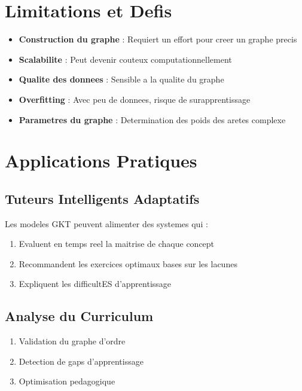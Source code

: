 \documentclass[11pt, a4paper]{article}
\begin{document}
\section{Limitations et Defis}

\begin{itemize}
    \item[$\times$] \textbf{Construction du graphe} : Requiert un effort pour creer un graphe precis

    \item[$\times$] \textbf{Scalabilite} : Peut devenir couteux computationnellement

    \item[$\times$] \textbf{Qualite des donnees} : Sensible a la qualite du graphe

    \item[$\times$] \textbf{Overfitting} : Avec peu de donnees, risque de surapprentissage

    \item[$\times$] \textbf{Parametres du graphe} : Determination des poids des aretes complexe
\end{itemize}

\section{Applications Pratiques}

\subsection{Tuteurs Intelligents Adaptatifs}

Les modeles GKT peuvent alimenter des systemes qui :
\begin{enumerate}
    \item Evaluent en temps reel la maitrise de chaque concept
    \item Recommandent les exercices optimaux bases sur les lacunes
    \item Expliquent les difficultES d'apprentissage
\end{enumerate}

\subsection{Analyse du Curriculum}

\begin{enumerate}
    \item Validation du graphe d'ordre
    \item Detection de gaps d'apprentissage
    \item Optimisation pedagogique
\end{enumerate}
\end{document}
